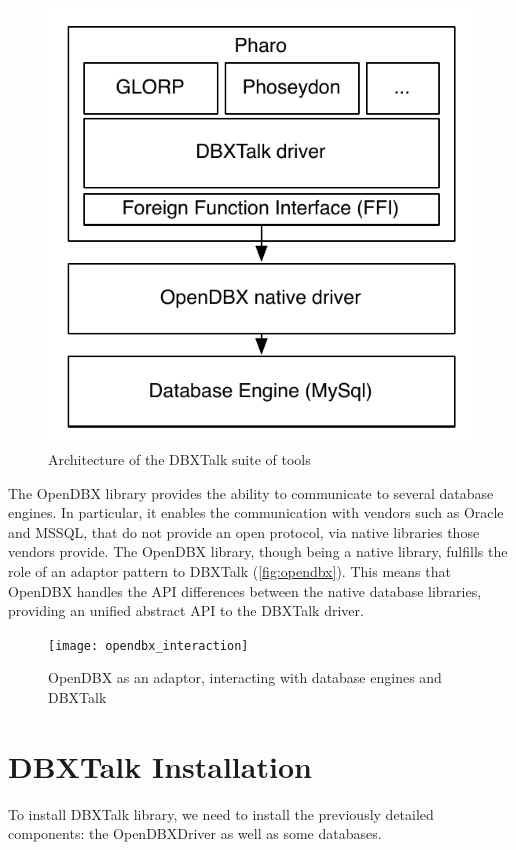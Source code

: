 \documentclass[a4paper,10pt,twoside]{book}
\begin{document}
\begin{figure}
\begin{center}
\includegraphics[width=.6\linewidth]{dbxarchitecture}
\caption{Architecture of the DBXTalk suite of tools \label{fig:dbxarchitecture}}
\end{center}
\end{figure}

The OpenDBX library provides the ability to communicate to several database engines. In particular, it enables the communication with vendors such as Oracle and MSSQL, that do not provide an open protocol, via native libraries those vendors provide. The OpenDBX library, though being a native library, fulfills the role of an adaptor pattern to DBXTalk (\autoref{fig:opendbx}). This means that OpenDBX handles the API differences between the native database libraries, providing an unified abstract API to the DBXTalk driver.

\begin{figure}
\begin{center}
\texttt{[image: opendbx\_interaction]}
\caption{OpenDBX as an adaptor, interacting with database engines and DBXTalk \label{fig:opendbx}}
\end{center}
\end{figure}


\section{DBXTalk Installation}
To install DBXTalk library, we need to install the previously detailed components: the OpenDBXDriver as well as some databases.
\end{document}
